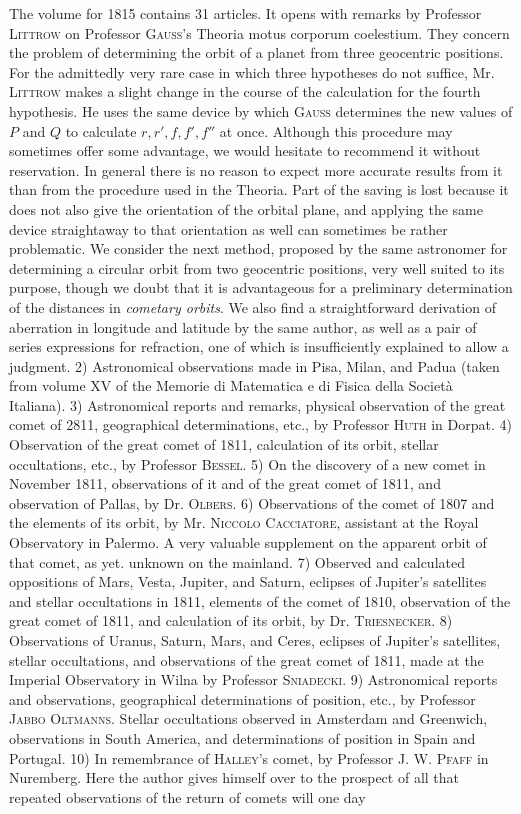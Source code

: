 The volume for 1815 contains 31 articles. It opens with remarks by Professor \textsc{Littrow} on Professor \textsc{Gauss}'s Theoria motus corporum coelestium. They concern the problem of determining the orbit of a planet from three geocentric positions. For the admittedly very rare case in which three hypotheses do not suffice, Mr. \textsc{Littrow} makes a slight change in the course of the calculation for the fourth hypothesis. He uses the same device by which \textsc{Gauss} determines the new values of $P$ and $Q$ to calculate $r, r', f, f', f''$ at once. Although this procedure may sometimes offer some advantage, we would hesitate to recommend it without reservation. In general there is no reason to expect more accurate results from it than from the procedure used in the Theoria. Part of the saving is lost because it does not also give the orientation of the orbital plane, and applying the same device straightaway to that orientation as well can sometimes be rather problematic. We consider the next method, proposed by the same astronomer for determining a circular orbit from two geocentric positions, very well suited to its purpose, though we doubt that it is advantageous for a preliminary determination of the distances in \emph{cometary orbits}. We also find a straightforward derivation of aberration in longitude and latitude by the same author, as well as a pair of series expressions for refraction, one of which is insufficiently explained to allow a judgment. 2) Astronomical observations made in Pisa, Milan, and Padua (taken from volume XV of the Memorie di Matematica e di Fisica della Società Italiana). 3) Astronomical reports and remarks, physical observation of the great comet of 2811, geographical determinations, etc., by Professor \textsc{Huth} in Dorpat. 4) Observation of the great comet of 1811, calculation of its orbit, stellar occultations, etc., by Professor \textsc{Bessel}. 5) On the discovery of a new comet in November 1811, observations of it and of the great comet of 1811, and observation of Pallas, by Dr. \textsc{Olbers}. 6) Observations of the comet of 1807 and the elements of its orbit, by Mr. \textsc{Niccolo Cacciatore}, assistant at the Royal Observatory in Palermo. A very valuable supplement on the apparent orbit of that comet, as yet. unknown on the mainland. 7) Observed and calculated oppositions of Mars, Vesta, Jupiter, and Saturn, eclipses of Jupiter's satellites and stellar occultations in 1811, elements of the comet of 1810, observation of the great comet of 1811, and calculation of its orbit, by Dr. \textsc{Triesnecker}. 8) Observations of Uranus, Saturn, Mars, and Ceres, eclipses of Jupiter's satellites, stellar occultations, and observations of the great comet of 1811, made at the Imperial Observatory in Wilna by Professor \textsc{Sniadecki}. 9) Astronomical reports and observations, geographical determinations of position, etc., by Professor \textsc{Jabbo Oltmanns}. Stellar occultations observed in Amsterdam and Greenwich, observations in South America, and determinations of position in Spain and Portugal. 10) In remembrance of \textsc{Halley}'s comet, by Professor J. W. \textsc{Pfaff} in Nuremberg. Here the author gives himself over to the prospect of all that repeated observations of the return of comets will one day 